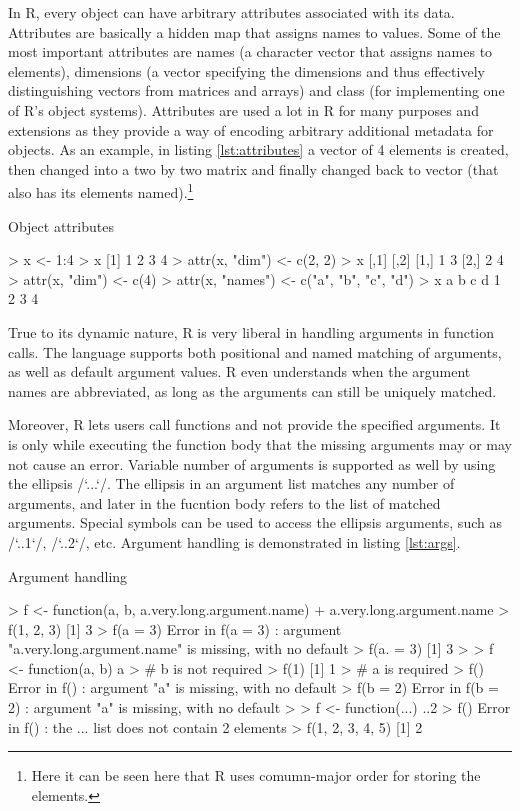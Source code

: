 {In R, every object can have arbitrary attributes associated with its data. Attributes are basically a hidden map that assigns names to values. Some of the most important attributes are names (a character vector that assigns names to elements), dimensions (a vector specifying the dimensions and thus effectively distinguishing vectors from matrices and arrays) and class (for implementing one of R's object systems). Attributes are used a lot in R for many purposes and extensions as they provide a way of encoding arbitrary additional metadata for objects. As an example, in listing \ref{lst:attributes} a vector of 4 elements is created, then changed into a two by two matrix and finally changed back to vector (that also has its elements named).\footnote{Here it can be seen here that R uses comumn-major order for storing the elements.}

\begin{listing}[htbp]
  \caption{\label{lst:attributes}Object attributes}
  \begin{rcode}
> x <- 1:4
> x
[1] 1 2 3 4
> attr(x, "dim") <- c(2, 2)
> x
     [,1] [,2]
[1,]    1    3
[2,]    2    4
> attr(x, "dim") <- c(4)
> attr(x, "names") <- c("a", "b", "c", "d")
> x
a b c d 
1 2 3 4 
  \end{rcode}
\end{listing}

True to its dynamic nature, R is very liberal in handling arguments in function calls. The language supports both positional and named matching of arguments, as well as default argument values. R even understands when the argument names are abbreviated, as long as the arguments can still be uniquely matched.

Moreover, R lets users call functions and not provide the specified arguments. It is only while executing the function body that the missing arguments may or may not cause an error. Variable number of arguments is supported as well by using the ellipsis \rinline/`...`/. The ellipsis in an argument list matches any number of arguments, and later in the fucntion body refers to the list of matched arguments. Special symbols can be used to access the ellipsis arguments, such as \rinline/`..1`/, \rinline/`..2`/, etc. Argument handling is demonstrated in listing \ref{lst:args}.

\begin{listing}[htbp]
  \caption{\label{lst:args}Argument handling}
  \begin{rcode}
> f <- function(a, b, a.very.long.argument.name)
+     a.very.long.argument.name
> f(1, 2, 3)
[1] 3
> f(a = 3)
Error in f(a = 3) : 
  argument "a.very.long.argument.name" is missing, with no default
> f(a. = 3)
[1] 3
>
> f <- function(a, b) a
> # b is not required
> f(1)
[1] 1
> # a is required
> f()
Error in f() : argument "a" is missing, with no default
> f(b = 2)
Error in f(b = 2) : argument "a" is missing, with no default
>
> f <- function(...) ..2
> f()
Error in f() : the ... list does not contain 2 elements
> f(1, 2, 3, 4, 5)
[1] 2
  \end{rcode}
\end{listing}

}
